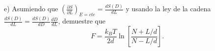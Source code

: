 e) Asumiendo que $\left(\frac{\partial S}{\partial L}\right)_{E=c t e}=\frac{d S(D)}{d L}$ y usando la ley de la cadena $\frac{d S(D)}{d L}=\frac{d S(D)}{d D} \frac{d D}{d L}$, demuestre que
$$
F=\frac{k_B T}{2 d} \ln \left[\frac{N+L / d}{N-L / d}\right] .
$$